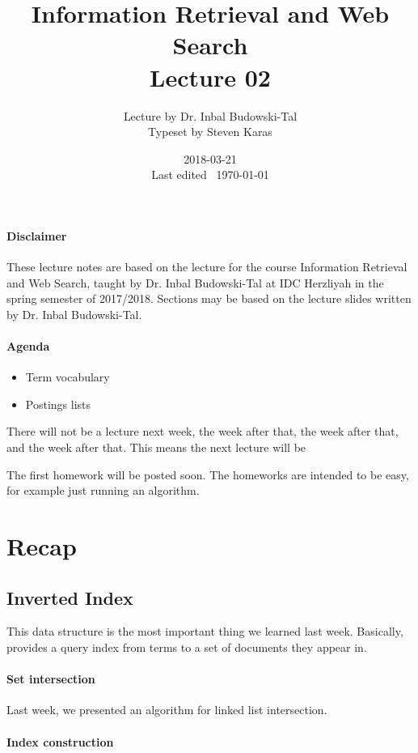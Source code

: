 \documentclass{idc_msc}
\title{Information Retrieval and Web Search\\\large Lecture 02}
\date{2018-03-21 \\ Last edited \currenttime\ \today}
\author{Lecture by Dr. Inbal Budowski-Tal\\Typeset by Steven Karas}
\begin{document}
\maketitle

\paragraph{Disclaimer}

These lecture notes are based on the lecture for the course Information Retrieval and Web Search, taught by Dr. Inbal Budowski-Tal at IDC Herzliyah in the spring semester of 2017/2018.
Sections may be based on the lecture slides written by Dr. Inbal Budowski-Tal.

\paragraph{Agenda}

\begin{itemize}
  \item Term vocabulary
  \item Postings lists
\end{itemize}

There will not be a lecture next week, the week after that, the week after that, and the week after that.
This means the next lecture will be 

The first homework will be posted soon.
The homeworks are intended to be easy, for example just running an algorithm.

\section{Recap}

\subsection{Inverted Index}

This data structure is the most important thing we learned last week.
Basically, provides a query index from terms to a set of documents they appear in.

\paragraph{Set intersection}

Last week, we presented an algorithm for linked list intersection.

\paragraph{Index construction}
\end{document}
